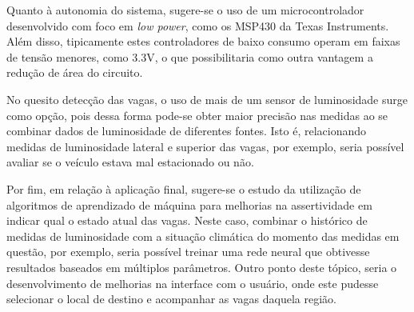 \documentclass[oneside,openright,12pt]{ufsm_2015} %
\begin{document}
Quanto à autonomia do sistema, sugere-se o uso de um microcontrolador desenvolvido com foco em \textit{low power}, como os MSP430 da Texas Instruments. Além disso, tipicamente estes controladores de baixo consumo operam em faixas de tensão menores, como 3.3V, o que possibilitaria como outra vantagem a redução de área do circuito.

No quesito detecção das vagas, o uso de mais de um sensor de luminosidade surge como opção, pois dessa forma pode-se obter maior precisão nas medidas ao se combinar dados de luminosidade de diferentes fontes. Isto é, relacionando medidas de luminosidade lateral e superior das vagas, por exemplo, seria possível avaliar se o veículo estava mal estacionado ou não.

Por fim, em relação à aplicação final, sugere-se o estudo da utilização de algoritmos de aprendizado de máquina para melhorias na assertividade em indicar qual o estado atual das vagas. Neste caso, combinar o histórico de medidas de luminosidade com a situação climática do momento das medidas em questão, por exemplo, seria possível treinar uma rede neural que obtivesse resultados baseados em múltiplos parâmetros. Outro ponto deste tópico, seria o desenvolvimento de melhorias na interface com o usuário, onde este pudesse selecionar o local de destino e acompanhar as vagas daquela região.





	
	
	
	\apendice %
\end{document}

